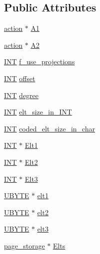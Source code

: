 \subsection*{Public Attributes}
\begin{DoxyCompactItemize}
\item 
\mbox{\hyperlink{classaction}{action}} $\ast$ \mbox{\hyperlink{classproduct__action_a04d3b3147350bc8abafa2011979d36be}{A1}}
\item 
\mbox{\hyperlink{classaction}{action}} $\ast$ \mbox{\hyperlink{classproduct__action_a55e81e988b24be63adb758016760af3e}{A2}}
\item 
\mbox{\hyperlink{galois_8h_a09fddde158a3a20bd2dcadb609de11dc}{I\+NT}} \mbox{\hyperlink{classproduct__action_ac2cdcc17f994aa2b9022e043120fb192}{f\+\_\+use\+\_\+projections}}
\item 
\mbox{\hyperlink{galois_8h_a09fddde158a3a20bd2dcadb609de11dc}{I\+NT}} \mbox{\hyperlink{classproduct__action_ae96c015ad5b35f847209afc87d728f11}{offset}}
\item 
\mbox{\hyperlink{galois_8h_a09fddde158a3a20bd2dcadb609de11dc}{I\+NT}} \mbox{\hyperlink{classproduct__action_aa6c958b8a7008c436f66de020df5968b}{degree}}
\item 
\mbox{\hyperlink{galois_8h_a09fddde158a3a20bd2dcadb609de11dc}{I\+NT}} \mbox{\hyperlink{classproduct__action_a336f63f7c648f28dbb418ae103d49082}{elt\+\_\+size\+\_\+in\+\_\+\+I\+NT}}
\item 
\mbox{\hyperlink{galois_8h_a09fddde158a3a20bd2dcadb609de11dc}{I\+NT}} \mbox{\hyperlink{classproduct__action_a4ad5769f204b8342c905106e112376b7}{coded\+\_\+elt\+\_\+size\+\_\+in\+\_\+char}}
\item 
\mbox{\hyperlink{galois_8h_a09fddde158a3a20bd2dcadb609de11dc}{I\+NT}} $\ast$ \mbox{\hyperlink{classproduct__action_a373a7257998f7937528cf6ea710b1669}{Elt1}}
\item 
\mbox{\hyperlink{galois_8h_a09fddde158a3a20bd2dcadb609de11dc}{I\+NT}} $\ast$ \mbox{\hyperlink{classproduct__action_aa94725bc52ef1c62462a86cc9df1ad8b}{Elt2}}
\item 
\mbox{\hyperlink{galois_8h_a09fddde158a3a20bd2dcadb609de11dc}{I\+NT}} $\ast$ \mbox{\hyperlink{classproduct__action_a5e09229d2551730a9300534b537e59c4}{Elt3}}
\item 
\mbox{\hyperlink{galois_8h_a122c4acf389c050379f00341fdcd5812}{U\+B\+Y\+TE}} $\ast$ \mbox{\hyperlink{classproduct__action_acf5c3d02e210c8a1e5e33c679c94a51c}{elt1}}
\item 
\mbox{\hyperlink{galois_8h_a122c4acf389c050379f00341fdcd5812}{U\+B\+Y\+TE}} $\ast$ \mbox{\hyperlink{classproduct__action_a2190bc75e0b57a22f4e4ed296cad0c1c}{elt2}}
\item 
\mbox{\hyperlink{galois_8h_a122c4acf389c050379f00341fdcd5812}{U\+B\+Y\+TE}} $\ast$ \mbox{\hyperlink{classproduct__action_aec996bc12b17467155a19eaf3ad6c781}{elt3}}
\item 
\mbox{\hyperlink{classpage__storage}{page\+\_\+storage}} $\ast$ \mbox{\hyperlink{classproduct__action_a239666d3db58ebaeeae86330082177b4}{Elts}}
\end{DoxyCompactItemize}
